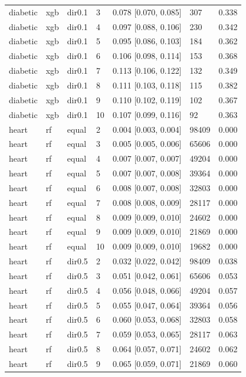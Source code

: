 \begin{tabular}{lllllll}
diabetic & xgb & dir0.1 & 3 & 0.078 [0.070, 0.085] & 307 & 0.338 \\
diabetic & xgb & dir0.1 & 4 & 0.097 [0.088, 0.106] & 230 & 0.342 \\
diabetic & xgb & dir0.1 & 5 & 0.095 [0.086, 0.103] & 184 & 0.362 \\
diabetic & xgb & dir0.1 & 6 & 0.106 [0.098, 0.114] & 153 & 0.368 \\
diabetic & xgb & dir0.1 & 7 & 0.113 [0.106, 0.122] & 132 & 0.349 \\
diabetic & xgb & dir0.1 & 8 & 0.111 [0.103, 0.118] & 115 & 0.382 \\
diabetic & xgb & dir0.1 & 9 & 0.110 [0.102, 0.119] & 102 & 0.367 \\
diabetic & xgb & dir0.1 & 10 & 0.107 [0.099, 0.116] & 92 & 0.363 \\
\addlinespace
heart & rf & equal & 2 & 0.004 [0.003, 0.004] & 98409 & 0.000 \\
heart & rf & equal & 3 & 0.005 [0.005, 0.006] & 65606 & 0.000 \\
heart & rf & equal & 4 & 0.007 [0.007, 0.007] & 49204 & 0.000 \\
heart & rf & equal & 5 & 0.007 [0.007, 0.008] & 39364 & 0.000 \\
heart & rf & equal & 6 & 0.008 [0.007, 0.008] & 32803 & 0.000 \\
heart & rf & equal & 7 & 0.008 [0.008, 0.009] & 28117 & 0.000 \\
heart & rf & equal & 8 & 0.009 [0.009, 0.010] & 24602 & 0.000 \\
heart & rf & equal & 9 & 0.009 [0.009, 0.010] & 21869 & 0.000 \\
heart & rf & equal & 10 & 0.009 [0.009, 0.010] & 19682 & 0.000 \\
heart & rf & dir0.5 & 2 & 0.032 [0.022, 0.042] & 98409 & 0.038 \\
heart & rf & dir0.5 & 3 & 0.051 [0.042, 0.061] & 65606 & 0.053 \\
heart & rf & dir0.5 & 4 & 0.056 [0.048, 0.066] & 49204 & 0.057 \\
heart & rf & dir0.5 & 5 & 0.055 [0.047, 0.064] & 39364 & 0.056 \\
heart & rf & dir0.5 & 6 & 0.060 [0.053, 0.068] & 32803 & 0.058 \\
heart & rf & dir0.5 & 7 & 0.059 [0.053, 0.065] & 28117 & 0.063 \\
heart & rf & dir0.5 & 8 & 0.064 [0.057, 0.071] & 24602 & 0.062 \\
heart & rf & dir0.5 & 9 & 0.065 [0.059, 0.071] & 21869 & 0.060 \\

\end{tabular}
